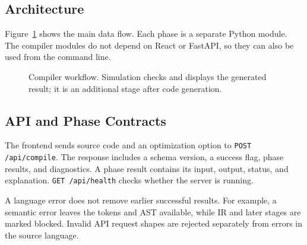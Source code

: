 \documentclass[conference]{IEEEtran}
\newcommand{\code}[1]{\texttt{#1}}
\begin{document}
\subsection{Architecture}
Figure~\ref{fig:pipeline} shows the main data flow. Each phase is a separate Python module. The compiler modules do not depend on React or FastAPI, so they can also be used from the command line.
\begin{figure}[ht]
\centering
{}
\caption{Compiler workflow. Simulation checks and displays the generated result; it is an additional stage after code generation.}
\label{fig:pipeline}
\end{figure}

\subsection{API and Phase Contracts}
The frontend sends source code and an optimization option to \code{POST /api/compile}. The response includes a schema version, a success flag, phase results, and diagnostics. A phase result contains its input, output, status, and explanation. \code{GET /api/health} checks whether the server is running.

A language error does not remove earlier successful results. For example, a semantic error leaves the tokens and AST available, while IR and later stages are marked blocked. Invalid API request shapes are rejected separately from errors in the source language.
\end{document}
